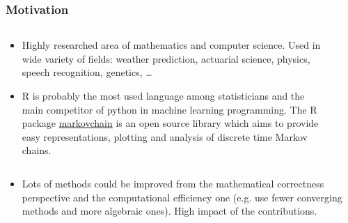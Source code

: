 \begin{frame}\frametitle{Motivation}
    \vspace{2em}
    \begin{columns}
    \begin{column}{0.5\textwidth}
    \begin{itemize}
    \item Highly researched area of mathematics and computer science. Used in 
    wide variety of fields: weather prediction, actuarial science, physics,
    speech recognition, genetics, \ldots
    \item R is probably the most used language among statisticians and the main 
    competitor of python in machine learning programming. The R package 
    \href{https://github.com/spedygiorgio/markovchain}{markovchain} is an 
    open source library which aims to provide easy representations, plotting 
    and analysis of discrete time Markov chains.
    \end{itemize}
    \end{column}
    
    \begin{column}{0.4\textwidth}
    \begin{figure}[htbp]
    \centering
    
    \end{figure}
    \end{column}
    \end{columns}
    
    \begin{columns}
    \begin{column}{\textwidth}
    \begin{itemize}
    \item Lots of methods could be improved from the mathematical correctness 
    perspective and the computational efficiency one (e.g. use fewer converging 
    methods and more algebraic ones). High impact of the contributions.
    \end{itemize}
    \end{column}
    \end{columns}
\end{frame}

